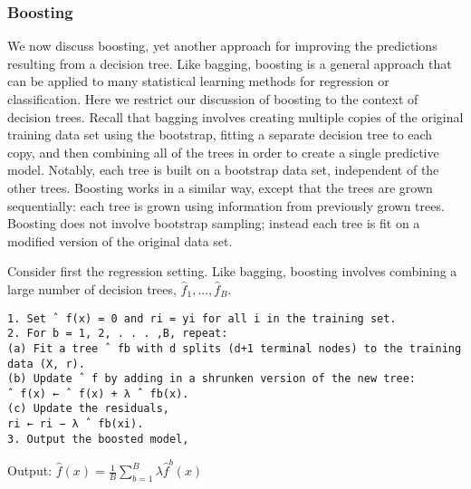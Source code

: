 \subsubsection{Boosting}
We now discuss boosting, yet another approach for improving the predictions resulting from a decision tree. Like bagging, boosting is a general approach that can be applied to many statistical learning methods for regression or classification. Here we restrict our discussion of boosting to the context of decision trees. Recall that bagging involves creating multiple copies of the original training data set using the bootstrap, fitting a separate decision tree to each copy, and then combining all of the trees in order to create a single predictive model. Notably, each tree is built on a bootstrap data set, independent of the other trees. Boosting works in a similar way, except that the trees are grown sequentially: each tree is grown using information from previously grown trees. Boosting does not involve bootstrap sampling; instead each tree is fit on a modified version of the original data set.

Consider first the regression setting. Like bagging, boosting involves combining a large number of decision trees, $\hat{f}_1, ...,  \hat{f}_B$.

\begin{verbatim}
1. Set ˆ f(x) = 0 and ri = yi for all i in the training set.
2. For b = 1, 2, . . . ,B, repeat:
(a) Fit a tree ˆ fb with d splits (d+1 terminal nodes) to the training
data (X, r).
(b) Update ˆ f by adding in a shrunken version of the new tree:
ˆ f(x) ← ˆ f(x) + λ ˆ fb(x).
(c) Update the residuals,
ri ← ri − λ ˆ fb(xi).
3. Output the boosted model,
\end{verbatim}

Output: $\hat{f}(x) = \frac{1}{B} \sum_{b=1}^{B} \lambda \hat{f}^b (x)$


